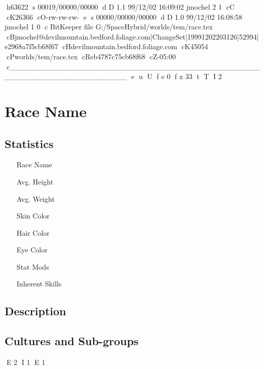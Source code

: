 h63622
s 00019/00000/00000
d D 1.1 99/12/02 16:09:02 jmochel 2 1
cC
cK26366
cO-rw-rw-rw-
e
s 00000/00000/00000
d D 1.0 99/12/02 16:08:58 jmochel 1 0
c BitKeeper file G:/SpaceHybrid/worlds/tem/race.tex
cBjmochel@devilmountain.bedford.foliage.com|ChangeSet|19991202203126|52994|e2968a7f5cb68f67
cHdevilmountain.bedford.foliage.com
cK45054
cPworlds/tem/race.tex
cReb4787c75cb68f68
cZ-05:00
c______________________________________________________________________
e
u
U
f e 0
f x 33
t
T
I 2
\chapter{Race Name}

\section{Statistics}

\begin{itemize}
	\item[Race Name]
	\item[Avg. Height]
	\item[Avg. Weight]
	\item[Skin Color]
	\item[Hair Color]
	\item[Eye Color]
	\item[Stat Mods]
	\item[Inherent Skills]
\end{itemize}

\section{Description}

\section{Cultures and Sub-groups}

E 2
I 1
E 1
